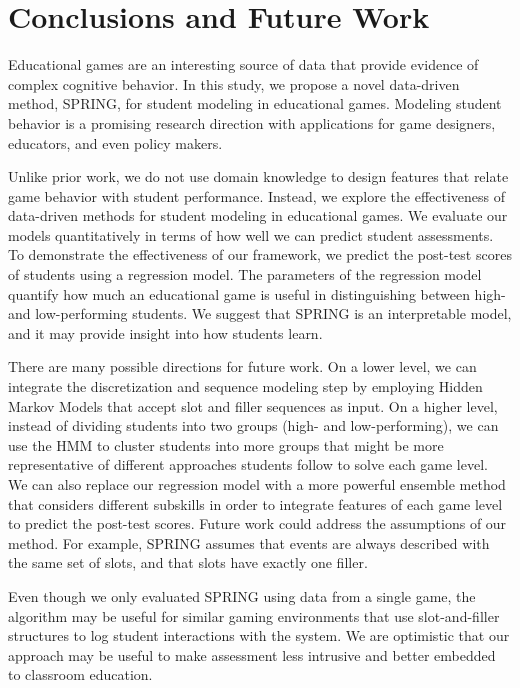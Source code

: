 \documentclass{sigchi}
\def\algname{SPRING\xspace}
\begin{document}
	\section{Conclusions and Future Work}
	\label{sec:conclusion} 
	
	Educational games are an interesting source of data that provide evidence of complex cognitive behavior.
	In this study, we propose a novel data-driven method, \algname,  for student modeling in educational games. 	
	Modeling student behavior  is a promising research direction with applications for game designers, educators, and even policy makers.
	
	Unlike prior work, we do not use domain knowledge to design features that relate game behavior with student performance.
	Instead, we  explore the effectiveness of data-driven methods for student modeling in educational games.
	We evaluate our models quantitatively in terms of how well we can predict student assessments.
	To demonstrate the effectiveness of our framework, we predict the post-test scores of students using a regression model.
	The parameters of the regression model quantify how much an educational game is useful in distinguishing between high- and low-performing students.
	We suggest that \algname is an interpretable model, and it may provide insight into how students learn.


	There are many possible directions for future work. 
	On a lower level, we can integrate the discretization and sequence modeling step by employing Hidden Markov Models that accept slot and filler sequences as input.
	On a higher level, instead of dividing students into two groups (high- and low-performing), we can use the HMM to cluster students \cite{bicego2003similarity,smyth1997clustering} into more groups that might be  more representative of different approaches students follow to solve each game level. 
	We can also replace our regression model with a more powerful ensemble method that considers different subskills in order to integrate features of each game level to predict the post-test scores.
	Future work could address the assumptions of our method.
	For example, \algname assumes that  events are always described with the same set of slots, and that slots have exactly one filler.
	
	Even though we only evaluated \algname using data from a single game, the algorithm  may be useful for similar gaming environments that use slot-and-filler structures to log student interactions with the system. 
	We are optimistic that our approach may be useful to make assessment less intrusive and better embedded to classroom education.

	
	\balance
	
	
\end{document}

